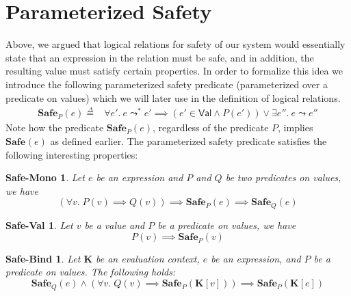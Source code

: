 \documentclass{article}
\newcommand{\VAL}{\mathsf{Val}}
\newcommand{\ectx}{\mathbf{K}}
\newcommand{\defeq}{\overset{\Delta}{=}}
\newcommand{\pred}{P}
\newcommand{\predB}{Q}
\newcommand{\expr}{e}
\newcommand{\val}{v}
\newcommand{\step}{\leadsto}
\newcommand{\steps}{\leadsto^*}
\newcommand{\Safe}[1]{\textbf{Safe}_{#1}}
\begin{document}
\section{Parameterized Safety}
\label{sec:safety}

Above, we argued that logical relations for safety of our system would essentially state that an expression in the relation must be safe, and in addition, the resulting value must satisfy certain properties.
In order to formalize this idea we introduce the following parameterized safety predicate (parameterized over a predicate on values) which we will later use in the definition of logical relations.
\begin{align*}
  \Safe{\pred}(\expr) \defeq{}& \forall \expr'.~ \expr \steps \expr' \implies (\expr' \in \VAL \land P(\expr')) \lor \exists \expr''.~\expr \step \expr''
\end{align*}
Note how the predicate $\Safe{\pred}(\expr)$, regardless of the predicate $\pred$, implies $\Safe{}(\expr)$ as defined earlier.
The parameterized safety predicate satisfies the following interesting properties:

\newtheorem*{safevallemma}{Safe-Val}
\newtheorem*{safebindlemma}{Safe-Bind}
\newtheorem*{safesteplemma}{Safe-Step}
\newtheorem*{safemonolemma}{Safe-Mono}

\begin{safemonolemma}
  \makeatletter{}\makeatother
  \label{lem:safemono}
  Let $\expr$ be an expression and $\pred$ and $\predB$ be two predicates on values, we have
  \[(\forall \val.\; \pred(\val) \implies \predB(\val)) \implies \Safe{\pred}(\expr) \implies \Safe{\predB}(\expr)\]
\end{safemonolemma}


\begin{safevallemma}
  \makeatletter{}\makeatother
  \label{lem:safeval}
  Let $\val$ be a value and $\pred$ be a predicate on values, we have
  \[\pred(\val) \implies \Safe{\pred}(\val)\]
\end{safevallemma}

\begin{safebindlemma}
  \makeatletter{}\makeatother
  \label{lem:safebind}
  Let $\ectx$ be an evaluation context, $\expr$ be an expression, and $\pred$ be a predicate on values.
  The following holds:
  \[\Safe{\predB}(\expr) \land (\forall \val.\; \predB(\val) \implies \Safe{\pred}(\ectx[\val])) \implies \Safe{\pred}(\ectx[\expr])\]
\end{safebindlemma}
\end{document}

